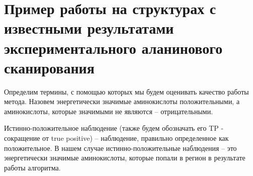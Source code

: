 \newpage




\newpage
\section{Пример работы на структурах с известными результатами  экспериментального аланинового сканирования}






Определим термины, с помощью которых мы будем оценивать качество работы метода. Назовем энергетически значимые аминокислоты  положительными, а аминокислоты, которые значимыми не являются -- отрицательными.

Истинно-положительное
наблюдение (также будем обозначать его TP - сокращение от true positive) --
наблюдение, правильно определенное как положительное. В нашем случае истинно-положительные наблюдения -- это энергетически значимые аминокислоты, которые попали в регион в результате работы алгоритма.

